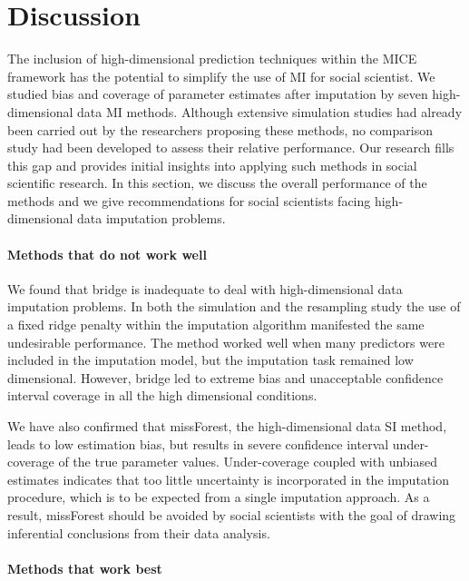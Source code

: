 \section{Discussion}

	The inclusion of high-dimensional prediction techniques within the MICE framework has the potential
	to simplify the use of MI for social scientist.
	We studied bias and coverage of parameter estimates after imputation by seven high-dimensional data 
	MI methods.
	Although extensive simulation studies had already been carried out by the researchers proposing these methods, 
	no comparison study had been developed to assess their relative performance.
	Our research fills this gap and provides initial insights into applying such methods in social scientific research.
	In this section, we discuss the overall performance of the methods and we give recommendations for social scientists 
	facing high-dimensional data imputation problems.

\paragraph{Methods that do not work well}

	We found that bridge is inadequate to deal with high-dimensional data imputation problems.
	In both the simulation and the resampling study the use of a fixed ridge penalty within the imputation
	algorithm manifested the same undesirable performance.
	The method worked well when many predictors were included in the imputation model, but the imputation
	task remained low dimensional.
	However, bridge led to extreme bias and unacceptable confidence interval coverage in all the high 
	dimensional conditions.

	We have also confirmed that missForest, the high-dimensional data SI method, leads to low estimation 
	bias, but results in severe confidence interval under-coverage of the true parameter values.
	Under-coverage coupled with unbiased estimates indicates that too little uncertainty is incorporated in 
	the imputation procedure, which is to be expected from a single imputation approach.
	As a result, missForest should be avoided by social scientists with the goal of drawing inferential 
	conclusions from their data analysis.

\paragraph{Methods that work best}

